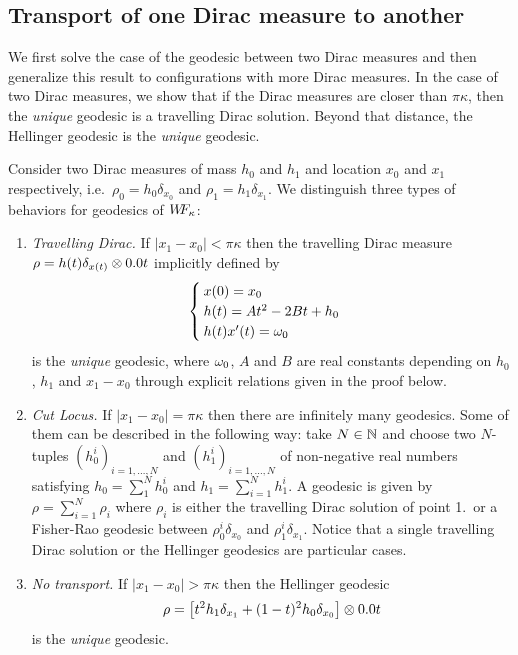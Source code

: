 \subsection{Transport of one Dirac measure to another}
\label{sec-travelling-dirac}

We first solve the case of the geodesic between two Dirac measures and then generalize this result to configurations with more Dirac measures. In the case of two Dirac measures, we show that if the Dirac measures are closer than $\pi \kappa$, then the \emph{unique} geodesic is a travelling Dirac solution. Beyond that distance, the Hellinger geodesic is the \emph{unique} geodesic.
\begin{theorem}
Consider two Dirac measures of mass $h_0$ and $h_1$ and location $x_0$ and $x_1$ respectively, i.e.\ $\rho_0=h_0\delta_{x_0}$ and $\rho_1=h_1\delta_{x_1}$. We distinguish three types of behaviors for geodesics of $W\! \! F_{\kappa}$:
\begin{enumerate}
\item \emph{Travelling Dirac.} If $\vert x_1 - x_0 \vert <\pi\kappa$ then the travelling Dirac measure $\rho= h(t) \delta_{x(t)} \otimes \d t$ implicitly defined by
\[
\begin{cases}
x(0) = x_0 \\
h(t) = At^2-2Bt+h_0\\
h(t)x'(t)=\omega_0
\end{cases}
\]
is the \emph{unique} geodesic, where $\omega_0$, $A$ and $B$ are real constants depending on $h_0$, $h_1$ and $x_1-x_0$ through explicit relations given in the proof below. 
\item \emph{Cut Locus.} If $\vert x_1 - x_0 \vert =\pi \kappa$ then there are infinitely many geodesics. Some of them can be described in the following way: take $N\in \mathbb{N}$ and choose two $N$-tuples $(h_0^i)_{i=1,\dots, N}$ and $(h_1^i)_{i=1,\dots, N}$ of non-negative real numbers satisfying $h_0=\sum_1^N h_0^i$ and $h_1=\sum_{i=1}^N h_1^i$. A geodesic is given by  $\rho= \sum_{i=1}^N \rho_i$ where $\rho_i$ is either the travelling Dirac solution of point 1.\ or a Fisher-Rao geodesic between $\rho_0^i \delta_{x_0}$ and $\rho_1^i \delta_{x_1}$. Notice that a single travelling Dirac solution or the Hellinger geodesics are particular cases.
\item \emph{No transport.} If $\vert x_1 - x_0 \vert> \pi \kappa$ then the Hellinger geodesic 
\[
\rho = \left[ t^2h_1\delta_{x_1}+(1-t)^2h_0\delta_{x_0}\right] \otimes \d t
\]
is the \emph{unique} geodesic.
\end{enumerate}
\end{theorem}

